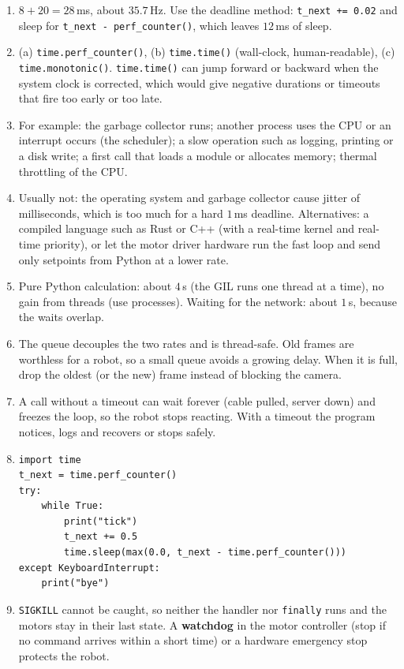 \begin{enumerate}[label=\textbf{\ansnum.\arabic*}]
  \item $8+20=28$\,ms, about $35.7$\,Hz. Use the deadline method: \verb!t_next += 0.02! and sleep for \verb!t_next - perf_counter()!, which leaves $12$\,ms of sleep.
  \item (a) \texttt{time.perf\_counter()}, (b) \texttt{time.time()} (wall-clock, human-readable), (c) \texttt{time.monotonic()}. \texttt{time.time()} can jump forward or backward when the system clock is corrected, which would give negative durations or timeouts that fire too early or too late.
  \item For example: the garbage collector runs; another process uses the CPU or an interrupt occurs (the scheduler); a slow operation such as logging, printing or a disk write; a first call that loads a module or allocates memory; thermal throttling of the CPU.
  \item Usually not: the operating system and garbage collector cause jitter of milliseconds, which is too much for a hard $1$\,ms deadline. Alternatives: a compiled language such as Rust or C++ (with a real-time kernel and real-time priority), or let the motor driver hardware run the fast loop and send only setpoints from Python at a lower rate.
  \item Pure Python calculation: about $4$\,s (the GIL runs one thread at a time), no gain from threads (use processes). Waiting for the network: about $1$\,s, because the waits overlap.
  \item The queue decouples the two rates and is thread-safe. Old frames are worthless for a robot, so a small queue avoids a growing delay. When it is full, drop the oldest (or the new) frame instead of blocking the camera.
  \item A call without a timeout can wait forever (cable pulled, server down) and freezes the loop, so the robot stops reacting. With a timeout the program notices, logs and recovers or stops safely.
  \item
\begin{verbatim}
import time
t_next = time.perf_counter()
try:
    while True:
        print("tick")
        t_next += 0.5
        time.sleep(max(0.0, t_next - time.perf_counter()))
except KeyboardInterrupt:
    print("bye")
\end{verbatim}
  \item \texttt{SIGKILL} cannot be caught, so neither the handler nor \texttt{finally} runs and the motors stay in their last state. A \textbf{watchdog} in the motor controller (stop if no command arrives within a short time) or a hardware emergency stop protects the robot.

\end{enumerate}
